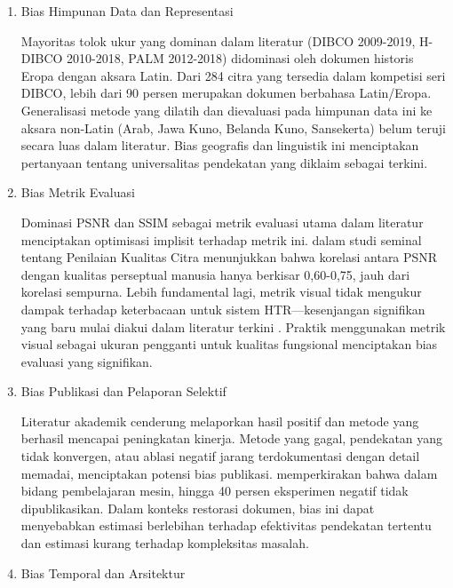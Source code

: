 \documentclass[12pt,a4paper]{article}
\begin{document}
\begin{enumerate}[leftmargin=*, labelindent=0pt, itemsep=1ex, topsep=0pt]

\item Bias Himpunan Data dan Representasi
\label{para:bias-dataset}

Mayoritas tolok ukur yang dominan dalam literatur (DIBCO 2009-2019, H-DIBCO 2010-2018, PALM 2012-2018) didominasi oleh dokumen historis Eropa dengan aksara Latin. Dari 284 citra yang tersedia dalam kompetisi seri DIBCO, lebih dari 90 persen merupakan dokumen berbahasa Latin/Eropa. Generalisasi metode yang dilatih dan dievaluasi pada himpunan data ini ke aksara non-Latin (Arab, Jawa Kuno, Belanda Kuno, Sansekerta) belum teruji secara luas dalam literatur. Bias geografis dan linguistik ini menciptakan pertanyaan tentang universalitas pendekatan yang diklaim sebagai terkini.

\item Bias Metrik Evaluasi
\label{para:bias-metrik}

Dominasi PSNR dan SSIM sebagai metrik evaluasi utama dalam literatur menciptakan optimisasi implisit terhadap metrik ini. \parencite{wang2004} dalam studi seminal tentang Penilaian Kualitas Citra menunjukkan bahwa korelasi antara PSNR dengan kualitas perseptual manusia hanya berkisar 0,60-0,75, jauh dari korelasi sempurna. Lebih fundamental lagi, metrik visual tidak mengukur dampak terhadap keterbacaan untuk sistem HTR—kesenjangan signifikan yang baru mulai diakui dalam literatur terkini \parencite{jadhav2022}. Praktik menggunakan metrik visual sebagai ukuran pengganti untuk kualitas fungsional menciptakan bias evaluasi yang signifikan.

\item Bias Publikasi dan Pelaporan Selektif
\label{para:bias-publikasi}

Literatur akademik cenderung melaporkan hasil positif dan metode yang berhasil mencapai peningkatan kinerja. Metode yang gagal, pendekatan yang tidak konvergen, atau ablasi negatif jarang terdokumentasi dengan detail memadai, menciptakan potensi bias publikasi. \parencite{ferguson2012} memperkirakan bahwa dalam bidang pembelajaran mesin, hingga 40 persen eksperimen negatif tidak dipublikasikan. Dalam konteks restorasi dokumen, bias ini dapat menyebabkan estimasi berlebihan terhadap efektivitas pendekatan tertentu dan estimasi kurang terhadap kompleksitas masalah.

\item Bias Temporal dan Arsitektur
\label{para:bias-temporal}


\end{enumerate}
\end{document}
